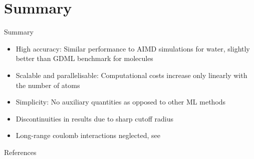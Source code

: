 \documentclass[aspectratio=169]{beamer}
\begin{document}
\section{Summary}
\begin{frame}{Summary}
\begin{itemize}
	\item<2-> High accuracy: Similar performance to AIMD simulations for water, slightly better than GDML benchmark for molecules
	\item<3-> Scalable and parallelisable: Computational costs increase only linearly with the number of atoms
	\item<4-> Simplicity: No auxiliary quantities as opposed to other ML methods 
\end{itemize}
\begin{itemize}
	\item<6-> Discontinuities in results due to sharp cutoff radius
	\item<7-> Long-range coulomb interactions neglected, see \cite{article}
\end{itemize}
\end{frame}

\begin{frame}{References}

\end{frame}
\end{document}
